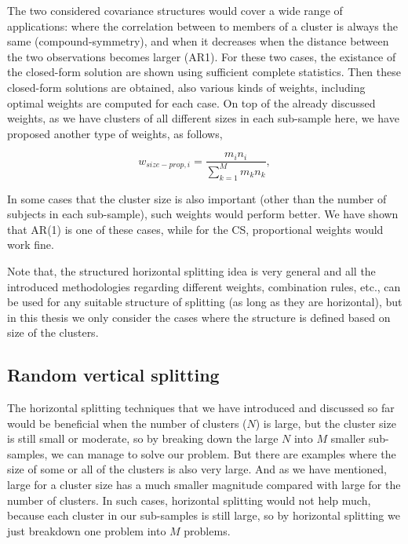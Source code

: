 \documentclass[11pt,a5paper,twoside]{book}
\begin{document}
The two considered covariance structures would cover a wide range of applications: where the correlation between to  members of a cluster is always the same (compound-symmetry), and when it decreases when the distance between the two observations becomes larger (AR1). For these two cases, the existance of the closed-form solution are shown using sufficient complete statistics. Then these closed-form solutions are obtained, also various kinds of weights, including optimal weights are computed for each case. On top of the already discussed weights, as we have clusters of all different sizes in each sub-sample here, we have proposed another type of weights, as follows,

\begin{equation}
\label{eq_size_prop_w}
w_{size-prop, i} = \frac{m_i n_i}{\sum_{k=1}^ M m_k n_k},
\end{equation}

In some cases that the cluster size is also important (other than the number of subjects in each sub-sample), such weights would perform better. We have shown that AR(1) is one of these cases, while for the CS, proportional weights would work fine. 

Note that, the structured horizontal splitting idea is very general and all the introduced methodologies regarding different weights, combination rules, etc., can be used for any suitable structure of splitting (as long as they are horizontal), but in this thesis we only consider the cases where the structure is defined based on size of the clusters. 

\subsection{Random vertical splitting}

The horizontal splitting techniques that we have introduced and discussed so far would be beneficial when the number of clusters ($N$) is large, but the cluster size is still small or moderate, so by breaking down the large $N$ into $M$ smaller sub-samples, we can manage to solve our problem. But there are examples where the size of some or all of the clusters is also very large. And as we have mentioned, large for a cluster size has a much smaller magnitude compared with large for the number of clusters. In such cases, horizontal splitting would not help much, because each cluster in our sub-samples is still large, so by horizontal splitting we just breakdown one problem into $M$ problems. 
\end{document}
